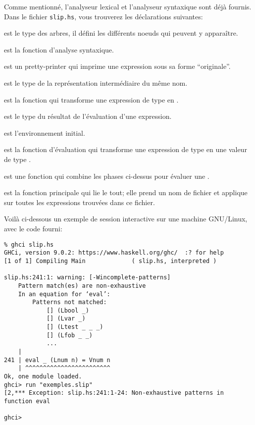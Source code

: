 \documentclass{article}
\begin{document}
Comme mentionné, l'analyseur lexical et l'analyseur syntaxique sont
déjà fournis.  Dans le fichier \texttt{slip.hs}, vous trouverez les
déclarations suivantes:
\begin{outitemize}
\item {} est le type des arbres, il défini les différents noeuds qui
  peuvent y apparaître.
\item {} est la fonction d'analyse syntaxique.
\item {} est un pretty-printer qui imprime une expression sous sa
  forme ``originale''.
\item {} est le type de la représentation intermédiaire du même nom.
\item {} est la fonction qui transforme une expression de type
   en .
\item {} est le type du résultat de l'évaluation d'une expression.
\item {} est l'environnement initial.
\item {} est la fonction d'évaluation qui transforme une expression
  de type  en une valeur de type .
\item {} est une fonction qui combine les phases ci-dessus pour
  évaluer une .
\item {} est la fonction principale qui lie le tout; elle prend un nom
  de fichier et applique  sur toutes les expressions trouvées
  dans ce fichier.
\end{outitemize}

Voilà ci-dessous un exemple de session interactive sur une machine GNU/Linux,
avec le code fourni:
{\small
\begin{verbatim}
% ghci slip.hs
GHCi, version 9.0.2: https://www.haskell.org/ghc/  :? for help
[1 of 1] Compiling Main             ( slip.hs, interpreted )

slip.hs:241:1: warning: [-Wincomplete-patterns]
    Pattern match(es) are non-exhaustive
    In an equation for ‘eval’:
        Patterns not matched:
            [] (Lbool _)
            [] (Lvar _)
            [] (Ltest _ _ _)
            [] (Lfob _ _)
            ...
    |
241 | eval _ (Lnum n) = Vnum n
    | ^^^^^^^^^^^^^^^^^^^^^^^^
Ok, one module loaded.
ghci> run "exemples.slip"
[2,*** Exception: slip.hs:241:1-24: Non-exhaustive patterns in function eval

ghci> 
\end{verbatim}
}
\end{document}
